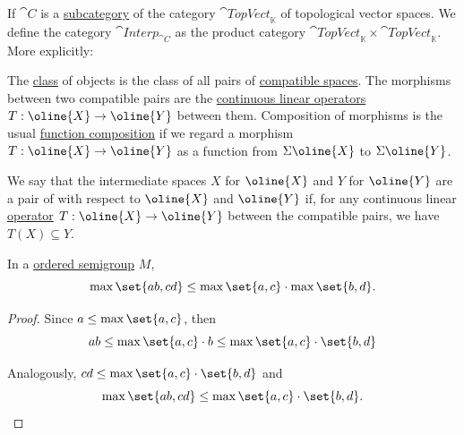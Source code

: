 \begin{definition}
\begin{thmenum}
     If \( \cat{C} \) is a \hyperref[def:subcategory]{subcategory} of the category \hyperref[def:category_of_topological_vector_spaces]{\( \cat{TopVect}_{\BbbK} \)} of topological vector spaces. We define the category \( \cat{Interp}_{\cat{C}} \) as the product category \( \cat{TopVect}_{\BbbK} \times \cat{TopVect}_{\BbbK} \). More explicitly:
    \begin{refenum}
       The \hyperref[def:set]{class} of objects is the class of all pairs of \hyperref[def:interpolated_topological_vector_space/compatibility]{compatible spaces}.
       The morphisms between two compatible pairs are the \hyperref[def:interpolated_topological_vector_space/morphisms]{continuous linear operators} \( T: \oline{X} \to \oline{Y} \) between them.
       Composition of morphisms is the usual \hyperref[def:set_valued_function/composition]{function composition} if we regard a morphism \( T: \oline{X} \to \oline{Y} \) as a function from \( \Sigma \oline{X} \) to \( \Sigma \oline{Y} \).
    \end{refenum}

     We say that the intermediate spaces \( X \) for \( \oline{X} \) and \( Y \) for \( \oline{Y} \) are a pair of  with respect to \( \oline{X} \) and \( \oline{Y} \) if, for any continuous linear \hyperref[def:interpolated_topological_vector_space/morphisms]{operator} \( T: \oline{X} \to \oline{Y} \) between the compatible pairs, we have \( T(X) \subseteq Y \).
  \end{thmenum}
\end{definition}

\begin{lemma}\label{thm:ordered_semigroup_max_distributivity}
  In a \hyperref[def:ordered_semigroup]{ordered semigroup} \( M \),
  \begin{equation}\label{eq:thm:ordered_semigroup_max_distributivity}
    \max \set{a b, c d} \leq \max \set{a, c} \cdot \max \set{b, d}.
  \end{equation}
\end{lemma}
\begin{proof}
  Since \( a \leq \max \set{a, c} \), then
  \begin{equation*}
    ab
    \leq
    \max \set{a, c} \cdot b
    \leq
    \max \set{a, c} \cdot \set{b, d}
  \end{equation*}

  Analogously, \( cd \leq \max \set{a, c} \cdot \set{b, d} \) and
  \begin{equation*}
    \max \set{a b, c d} \leq \max \set{a, c} \cdot \set{b, d}.
  \end{equation*}
\end{proof}

